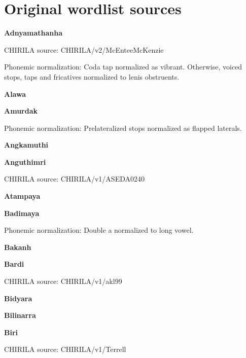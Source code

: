 \newpage

\hypertarget{original-wordlist-sources}{%
\section{Original wordlist sources}\label{original-wordlist-sources}}

\textbf{Adnyamathanha}

CHIRILA source: CHIRILA/v2/McEnteeMcKenzie


Phonemic normalization: Coda tap normalized as vibrant. Otherwise,
voiced stops, taps and fricatives normalized to lenis obstruents.

\textbf{Alawa}


\textbf{Amurdak}


Phonemic normalization: Prelateralized stops normalized as flapped
laterals.

\textbf{Angkamuthi}


\textbf{Anguthimri}

CHIRILA source: CHIRILA/v1/ASEDA0240


\textbf{Atampaya}


\textbf{Badimaya}


Phonemic normalization: Double a normalized to long vowel.

\textbf{Bakanh}


\textbf{Bardi}

CHIRILA source: CHIRILA/v1/akl99


\textbf{Bidyara}


\textbf{Bilinarra}


\textbf{Biri}

CHIRILA source: CHIRILA/v1/Terrell



